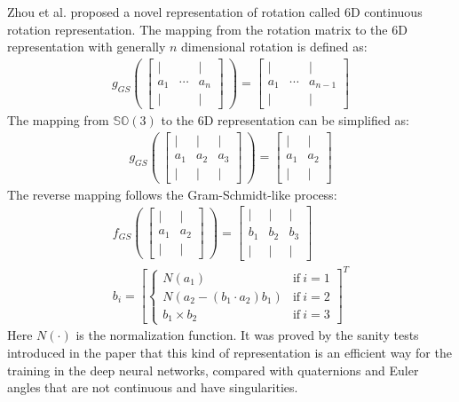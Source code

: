\documentclass[12pt,DIV14,BCOR12mm,a4paper,footinclude=false,headinclude,parskip=half-,twoside,openright,cleardoublepage=empty,toc=index,bibliography=totoc,listof=totoc]{scrreprt}
\numberwithin{equation}{chapter}
\begin{document}
Zhou et al.\cite{Zhou_2019_CVPR} proposed a novel representation of rotation called 6D continuous rotation representation. The mapping from the rotation matrix to the 6D representation with generally $n$ dimensional rotation is defined as:
\begin{align}
  g_{GS}\left( \
    \begin{bmatrix}
      | & & | \\
      a_{1}  & \cdots & a_{n} \\
      | & & |
    \end{bmatrix} \
  \right) = 
  \begin{bmatrix}
    | & & | \\
    a_{1}  & \cdots & a_{n-1} \\
    | & & |
  \end{bmatrix}
\end{align}
The mapping from $\mathbb{S} \mathbb{O} (3)$ to the 6D representation can be simplified as:
\begin{align}\label{eq:ortho6d}
  g_{GS}\left( \
    \begin{bmatrix}
      | & | & | \\
      a_{1}  & a_{2} & a_{3} \\
      | & | & |
    \end{bmatrix} \
  \right) = 
  \begin{bmatrix}
    | & | \\
    a_{1} & a_{2} \\
    | & |
  \end{bmatrix}
\end{align}
The reverse mapping follows the Gram-Schmidt-like process:
\begin{gather}
  f_{GS}\left( \ 
    \begin{bmatrix}
      | & | \\
      a_{1}  & a_{2}  \\
      | & | 
    \end{bmatrix} \
  \right) = 
  \begin{bmatrix}
    | & | & |\\
    b_{1} & b_{2} & b_{3}\\
    | & | & |
  \end{bmatrix} \\
  b_{i} = \left[\left\{
    \begin{array}{lr}
    N(a_{1}) & \text{if} \ i=1\\
    N(a_{2}-(b_{1}\cdot a_{2})b_{1}) & \text{if} \ i=2\\
    b_{1}\times b_{2}& \text{if} \ i=3
    \end{array} 
  \right.
  \right] ^{T}
\end{gather}
Here $N(\cdot)$ is the normalization function. It was proved by the sanity tests introduced in the paper that this kind of representation is an efficient way for the training in the deep neural networks, compared with quaternions and Euler angles that are not continuous and have singularities.
\end{document}
